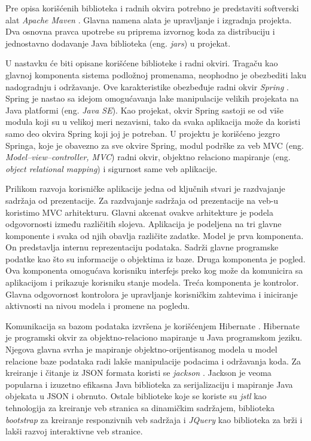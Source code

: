 \documentclass[12pt,oneside]{memoir}
\begin{document}
Pre opisa korišćenih biblioteka i radnih okvira potrebno je predstaviti softverski alat \textit{Apache Maven} \cite{Maven}. Glavna namena alata je upravljanje i izgradnja projekta. Dva osnovna pravca upotrebe su priprema izvornog koda za distribuciju i jednostavno dodavanje Java biblioteka (eng. \textit{jars}) u projekat. 

U nastavku će biti opisane korišćene biblioteke i radni okviri. Tragaču kao glavnoj komponenta sistema podložnoj promenama, neophodno je obezbediti laku nadogradnju i održavanje. Ove karakteristike obezbeđuje radni okvir \textit{Spring} \cite{Spring}. Spring je nastao sa idejom omogućavanja lake manipulacije velikih projekata na Java platformi (eng. \textit{Java SE}). Kao projekat, okvir Spring sastoji se od više modula koji su u velikoj meri nezavisni, tako da svaka aplikacija može da koristi samo deo okvira Spring koji joj je potreban. U projektu je korišćeno jezgro Springa, koje je obavezno za sve okvire Spring, modul podrške za veb MVC (eng. \textit{Model–view–controller, MVC}) radni okvir, objektno relaciono mapiranje (eng. \textit{object relational mapping}) i sigurnost same veb aplikacije.

Prilikom razvoja korisničke aplikacije jedna od ključnih stvari je razdvajanje sadržaja od prezentacije. Za razdvajanje sadržaja od prezentacije na veb-u koristimo MVC arhitekturu. Glavni akcenat ovakve arhitekture je podela odgovornosti između različitih slojeva. Aplikacija je podeljena na tri glavne komponente i svaka od njih obavlja različite zadatke. Model je prva komponenta. On predstavlja internu reprezentaciju podataka. Sadrži glavne programske podatke kao što su informacije o objektima iz baze. Druga komponenta je pogled. Ova komponenta omogućava korisniku interfejs preko kog može da komunicira sa aplikacijom i prikazuje korisniku stanje modela. Treća komponenta je kontrolor. Glavna odgovornost kontrolora je upravljanje korisničkim zahtevima i iniciranje aktivnosti na nivou modela i promene na pogledu. 

Komunikacija sa bazom podataka izvršena je korišćenjem Hibernate \cite{Hibernate}. Hibernate je programski okvir za objektno-relaciono mapiranje u Java programskom jeziku. Njegova glavna svrha je mapiranje objektno-orijentisanog modela u model relacione baze podataka radi lakše manipulacije podacima i održavanja koda. Za kreiranje i čitanje iz JSON formata koristi se \textit{jackson} \cite{Jackson}. Jackson je veoma popularna i izuzetno efikasna Java biblioteka za serijalizaciju i mapiranje Java objekata u JSON i obrnuto. Ostale biblioteke koje se koriste su \textit{jstl} \cite{JSTL} kao tehnologija za kreiranje veb stranica sa dinamičkim sadržajem, biblioteka \textit{bootstrap} \cite{Bootstrap} za kreiranje responzivnih veb sadržaja i \textit{JQuery} \cite{JQuery} kao biblioteka za brži i lakši razvoj interaktivne veb stranice. 
\end{document}
